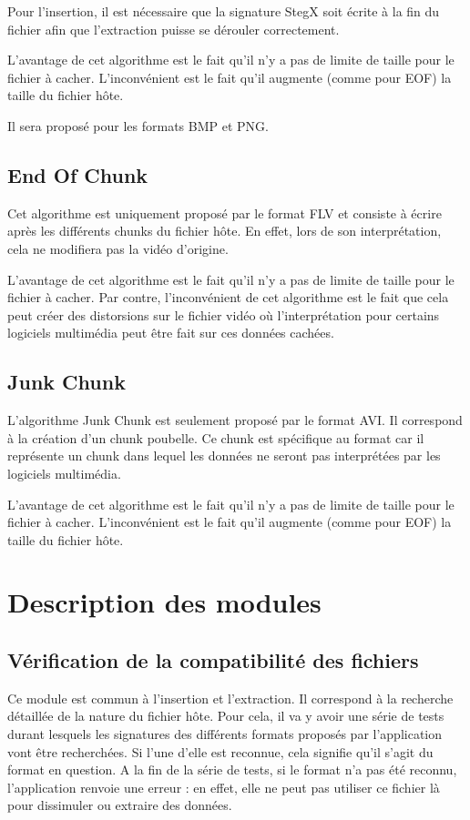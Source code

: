 \documentclass[11pt]{article}
\begin{document}
Pour l'insertion, il est nécessaire que la signature StegX soit écrite à 
la fin du fichier afin que l'extraction puisse se dérouler correctement. 

L'avantage de cet algorithme est le fait qu'il n'y a pas de limite de 
taille pour le fichier à cacher. L'inconvénient est le fait qu'il augmente 
(comme pour EOF) la taille du fichier hôte.  

Il sera proposé pour les formats BMP et PNG. 

\subsection{End Of Chunk}

Cet algorithme est uniquement proposé par le format FLV et consiste à 
écrire après les différents chunks du fichier hôte. En effet, lors de 
son interprétation, cela ne modifiera pas la vidéo d'origine. 

L'avantage de cet algorithme est le fait qu'il n'y a pas de limite de 
taille pour le fichier à cacher. Par contre, l'inconvénient de cet algorithme 
est le fait que cela peut créer des distorsions sur le fichier vidéo où 
l'interprétation pour certains logiciels multimédia peut être fait sur ces 
données cachées. 

\subsection{Junk Chunk}

L'algorithme Junk Chunk est seulement proposé par le format AVI. Il correspond 
à la création d'un chunk poubelle. Ce chunk est spécifique au format car il
représente un chunk dans lequel les données ne seront pas interprétées par 
les logiciels multimédia. 

L'avantage de cet algorithme est le fait qu'il n'y a pas de limite de 
taille pour le fichier à cacher.  L'inconvénient est le fait qu'il augmente 
(comme pour EOF) la taille du fichier hôte.  

\section{Description des modules}

\subsection{Vérification de la compatibilité des fichiers}

Ce module est commun à l'insertion et l'extraction. Il correspond à la 
recherche détaillée de la nature du fichier hôte. 
Pour cela, il va y avoir une série de tests durant lesquels les
signatures des différents formats proposés par l'application vont être recherchées. 
Si l'une d'elle est reconnue, cela signifie qu'il s'agit du format en question. 
A la fin de la série de tests, si le format n'a pas été reconnu, 
l'application renvoie une erreur : en effet, elle ne peut pas utiliser ce 
fichier là pour dissimuler ou extraire des données. 
\end{document}
